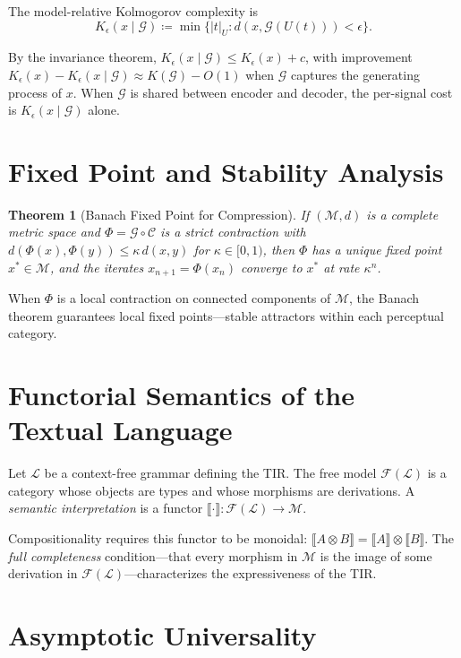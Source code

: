 \documentclass[11pt,a4paper]{article}
\newtheorem{theorem}{Theorem}[section]
\theoremstyle{definition}
\theoremstyle{remark}
\begin{document}
The model-relative Kolmogorov complexity is
\[
K_\epsilon(x \mid \mathcal{G}) \coloneqq \min \{ |t|_U : d(x, \mathcal{G}(U(t))) < \epsilon \}.
\]

By the invariance theorem, $K_\epsilon(x \mid \mathcal{G}) \le K_\epsilon(x) + c$, with improvement $K_\epsilon(x) - K_\epsilon(x \mid \mathcal{G}) \approx K(\mathcal{G}) - O(1)$ when $\mathcal{G}$ captures the generating process of $x$. When $\mathcal{G}$ is shared between encoder and decoder, the per-signal cost is $K_\epsilon(x \mid \mathcal{G})$ alone.

\section{Fixed Point and Stability Analysis}
\label{app:stability}

\begin{theorem}[Banach Fixed Point for Compression]
If $(\mathcal{M}, d)$ is a complete metric space and $\Phi = \mathcal{G} \circ \mathcal{C}$ is a strict contraction with $d(\Phi(x), \Phi(y)) \le \kappa \, d(x,y)$ for $\kappa \in [0,1)$, then $\Phi$ has a unique fixed point $x^* \in \mathcal{M}$, and the iterates $x_{n+1} = \Phi(x_n)$ converge to $x^*$ at rate $\kappa^n$.
\end{theorem}

When $\Phi$ is a local contraction on connected components of $\mathcal{M}$, the Banach theorem guarantees local fixed points---stable attractors within each perceptual category.

\section{Functorial Semantics of the Textual Language}
\label{app:functorial}

Let $\mathcal{L}$ be a context-free grammar defining the TIR. The free model $\mathcal{F}(\mathcal{L})$ is a category whose objects are types and whose morphisms are derivations. A \emph{semantic interpretation} is a functor $\llbracket \cdot \rrbracket : \mathcal{F}(\mathcal{L}) \to \mathcal{M}$.

Compositionality requires this functor to be monoidal: $\llbracket A \otimes B \rrbracket = \llbracket A \rrbracket \otimes \llbracket B \rrbracket$. The \emph{full completeness} condition---that every morphism in $\mathcal{M}$ is the image of some derivation in $\mathcal{F}(\mathcal{L})$---characterizes the expressiveness of the TIR.

\section{Asymptotic Universality}
\label{app:universality}
\end{document}
